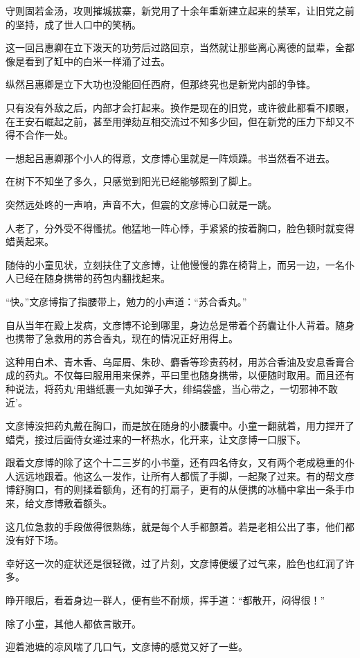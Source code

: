 守则固若金汤，攻则摧城拔寨，新党用了十余年重新建立起来的禁军，让旧党之前的坚持，成了世人口中的笑柄。

这一回吕惠卿在立下泼天的功劳后过路回京，当然就让那些离心离德的鼠辈，全都像是看到了缸中的白米一样涌了过去。

纵然吕惠卿是立下大功也没能回任西府，但那终究也是新党内部的争锋。

只有没有外敌之后，内部才会打起来。换作是现在的旧党，或许彼此都看不顺眼，在王安石崛起之前，甚至用弹劾互相交流过不知多少回，但在新党的压力下却又不得不合作一处。

一想起吕惠卿那个小人的得意，文彦博心里就是一阵烦躁。书当然看不进去。

在树下不知坐了多久，只感觉到阳光已经能够照到了脚上。

突然远处咚的一声响，声音不大，但震的文彦博心口就是一跳。

人老了，分外受不得慅扰。他猛地一阵心悸，手紧紧的按着胸口，脸色顿时就变得蜡黄起来。

随侍的小童见状，立刻扶住了文彦博，让他慢慢的靠在椅背上，而另一边，一名仆人已经在随身携带的药包内翻找起来。

“快。”文彦博指了指腰带上，勉力的小声道：“苏合香丸。”

自从当年在殿上发病，文彦博不论到哪里，身边总是带着个药囊让仆人背着。随身也携带了急救用的苏合香丸，现在的情况正好用得上。

这种用白术、青木香、乌犀屑、朱砂、麝香等珍贵药材，用苏合香油及安息香膏合成的药丸。不仅每曰服用用来保养，平曰里也随身携带，以便随时取用。而且还有种说法，将药丸‘用蜡纸裹一丸如弹子大，绯绢袋盛，当心带之，一切邪神不敢近’。

文彦博没把药丸戴在胸口，而是放在随身的小腰囊中。小童一翻就着，用力捏开了蜡壳，接过后面侍女递过来的一杯热水，化开来，让文彦博一口服下。

跟着文彦博的除了这个十二三岁的小书童，还有四名侍女，又有两个老成稳重的仆人远远地跟着。他这么一发作，让所有人都慌了手脚，一起聚了过来。有的帮文彦博舒胸口，有的则揉着额角，还有的打扇子，更有的从便携的冰桶中拿出一条手巾来，给文彦博敷着额头。

这几位急救的手段做得很熟练，就是每个人手都颤着。若是老相公出了事，他们都没有好下场。

幸好这一次的症状还是很轻微，过了片刻，文彦博便缓了过气来，脸色也红润了许多。

睁开眼后，看着身边一群人，便有些不耐烦，挥手道：“都散开，闷得很！”

除了小童，其他人都依言散开。

迎着池塘的凉风喘了几口气，文彦博的感觉又好了一些。

